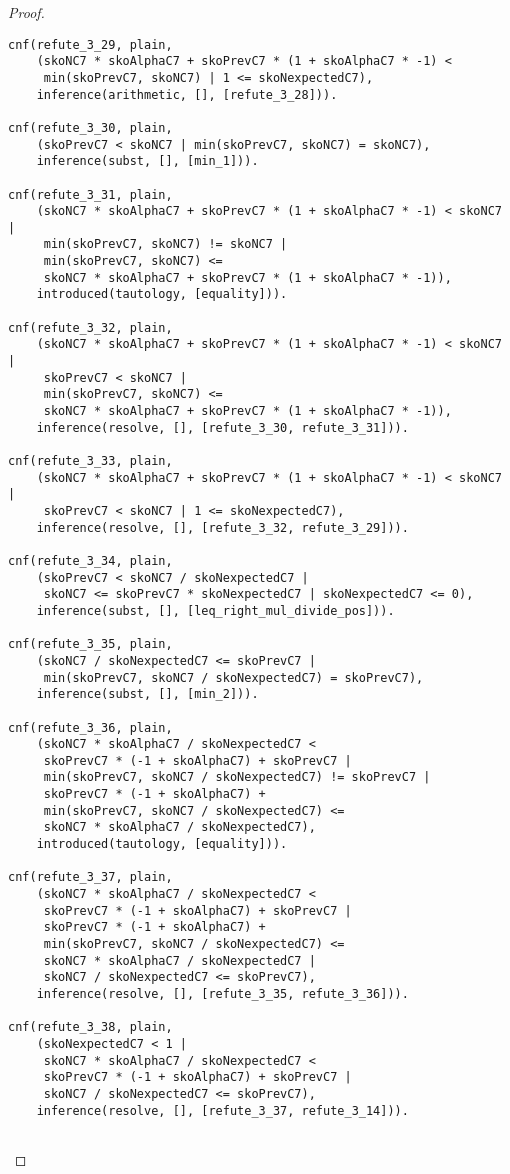 \begin{proof}
\begin{verbatim}
cnf(refute_3_29, plain,
    (skoNC7 * skoAlphaC7 + skoPrevC7 * (1 + skoAlphaC7 * -1) <
     min(skoPrevC7, skoNC7) | 1 <= skoNexpectedC7),
    inference(arithmetic, [], [refute_3_28])).

cnf(refute_3_30, plain,
    (skoPrevC7 < skoNC7 | min(skoPrevC7, skoNC7) = skoNC7),
    inference(subst, [], [min_1])).

cnf(refute_3_31, plain,
    (skoNC7 * skoAlphaC7 + skoPrevC7 * (1 + skoAlphaC7 * -1) < skoNC7 |
     min(skoPrevC7, skoNC7) != skoNC7 |
     min(skoPrevC7, skoNC7) <=
     skoNC7 * skoAlphaC7 + skoPrevC7 * (1 + skoAlphaC7 * -1)),
    introduced(tautology, [equality])).

cnf(refute_3_32, plain,
    (skoNC7 * skoAlphaC7 + skoPrevC7 * (1 + skoAlphaC7 * -1) < skoNC7 |
     skoPrevC7 < skoNC7 |
     min(skoPrevC7, skoNC7) <=
     skoNC7 * skoAlphaC7 + skoPrevC7 * (1 + skoAlphaC7 * -1)),
    inference(resolve, [], [refute_3_30, refute_3_31])).

cnf(refute_3_33, plain,
    (skoNC7 * skoAlphaC7 + skoPrevC7 * (1 + skoAlphaC7 * -1) < skoNC7 |
     skoPrevC7 < skoNC7 | 1 <= skoNexpectedC7),
    inference(resolve, [], [refute_3_32, refute_3_29])).

cnf(refute_3_34, plain,
    (skoPrevC7 < skoNC7 / skoNexpectedC7 |
     skoNC7 <= skoPrevC7 * skoNexpectedC7 | skoNexpectedC7 <= 0),
    inference(subst, [], [leq_right_mul_divide_pos])).

cnf(refute_3_35, plain,
    (skoNC7 / skoNexpectedC7 <= skoPrevC7 |
     min(skoPrevC7, skoNC7 / skoNexpectedC7) = skoPrevC7),
    inference(subst, [], [min_2])).

cnf(refute_3_36, plain,
    (skoNC7 * skoAlphaC7 / skoNexpectedC7 <
     skoPrevC7 * (-1 + skoAlphaC7) + skoPrevC7 |
     min(skoPrevC7, skoNC7 / skoNexpectedC7) != skoPrevC7 |
     skoPrevC7 * (-1 + skoAlphaC7) +
     min(skoPrevC7, skoNC7 / skoNexpectedC7) <=
     skoNC7 * skoAlphaC7 / skoNexpectedC7),
    introduced(tautology, [equality])).

cnf(refute_3_37, plain,
    (skoNC7 * skoAlphaC7 / skoNexpectedC7 <
     skoPrevC7 * (-1 + skoAlphaC7) + skoPrevC7 |
     skoPrevC7 * (-1 + skoAlphaC7) +
     min(skoPrevC7, skoNC7 / skoNexpectedC7) <=
     skoNC7 * skoAlphaC7 / skoNexpectedC7 |
     skoNC7 / skoNexpectedC7 <= skoPrevC7),
    inference(resolve, [], [refute_3_35, refute_3_36])).

cnf(refute_3_38, plain,
    (skoNexpectedC7 < 1 |
     skoNC7 * skoAlphaC7 / skoNexpectedC7 <
     skoPrevC7 * (-1 + skoAlphaC7) + skoPrevC7 |
     skoNC7 / skoNexpectedC7 <= skoPrevC7),
    inference(resolve, [], [refute_3_37, refute_3_14])).


\end{verbatim}
\end{proof}
